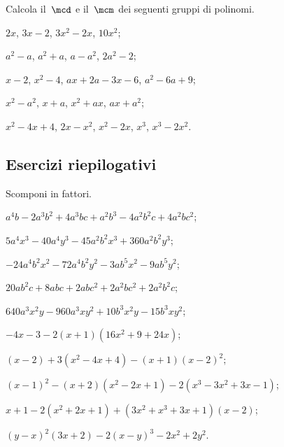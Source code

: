 \begin{esercizio}
\label{ese:13.96}
Calcola il~$\mcd$ e il~$\mcm$ dei seguenti gruppi di polinomi.
\begin{enumeratea}
 \item $2x$, $3x-2$, $3x^{2}-2x$, $10x^{2}$;
 \item $a^{2}-a$, $a^{2}+a$, $a-a^{2}$, $2a^{2}-2$;
 \item $x-2$, $x^{2}-4$, $ax+2a-3x-6$, $a^{2}-6a+9$;
 \item $x^{2}-a^{2}$, $x+a$, $x^{2}+ax$, $ax+a^{2}$;
 \item $x^{2}-4x+4$, $2x-x^{2}$, $x^{2}-2x$, $x^{3}$, $x^{3}-2x^{2}$.
\end{enumeratea}
\end{esercizio}

\subsection{Esercizi riepilogativi}

\begin{esercizio}[\Ast]
 \label{ese:13.97}
 Scomponi in fattori.
 \begin{enumeratea}
\item $a^{4}b-2a^{3}b^{2}+4a^{3}{bc}+a^{2}b^{3}-4a^{2}b^{2}c+4a^{2}bc^{2}$;
\item $5a^{4}x^{3}-40a^{4}y^{3}-45a^{2}b^{2}x^{3}+360a^{2}b^{2}y^{3}$;
\item $-24a^{4}b^{2}x^{2}-72a^{4}b^{2}y^{2}-3ab^{5}x^{2}-9ab^{5}y^{2}$;
\item $20ab^{2}c+8abc+2abc^{2}+2a^{2}bc^{2}+2a^{2}b^{2}c$;
\item $640a^{3}x^{2}y-960a^{3}xy^{2}+10b^{3}x^{2}y-15b^{3}xy^{2}$;
\item $-4x-3-2(x+1)(16x^{2}+9+24x)$;
\item $(x-2)+3(x^{2}-4x+4)-(x+1)(x-2)^{2}$;
\item $(x-1)^{2}-(x+2)(x^{2}-2x+1)-2(x^{3}-3x^{2}+3x-1)$;
\item $x+1-2(x^{2}+2x+1)+(3x^{2}+x^{3}+3x+1)(x-2)$;
\item $(y-x)^{2}(3x+2)-2(x-y)^{3}-2x^{2}+2y^{2}$.
 \end{enumeratea}
\end{esercizio}

